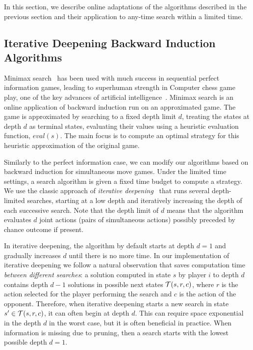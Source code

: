 
In this section, we describe online adaptations of the algorithms described in the previous section and their application
to any-time search within a limited time.

\subsection{Iterative Deepening Backward Induction Algorithms} \label{sec:idbi}

Minimax search~\cite{AIbook} has been used with much success in sequential perfect information games,
leading to superhuman strength in Computer chess game play, one of the key advances of artificial
intelligence~\cite{Campbell02deepblue}.
Minimax search is an online application of backward induction run on an approximated game.
The game is approximated by searching to a fixed depth limit $d$, treating the states at depth $d$
as terminal states, evaluating their values using a heuristic evaluation function, $eval(s)$.
The main focus is to compute an optimal strategy for this heuristic approximation of the original game.

Similarly to the perfect information case, we can modify our algorithms based on backward induction for simultaneous move games.
Under the limited time settings, a search algorithm is given a fixed time budget to compute a strategy.
We use the classic approach of {\it iterative deepening}~\cite{AIbook} that runs several depth-limited
searches, starting at a low depth and iteratively increasing the depth of each successive search.
Note that the depth limit of $d$ means that the algorithm evaluates $d$ joint actions (\ie pairs of simultaneous actions) possibly preceded by chance outcome if present.

In iterative deepening, the algorithm by default starts at depth $d = 1$ and gradually increases $d$ until there is no more time.
In our implementation of iterative deepening we follow a natural observation that saves computation time {\it between different searches}: 
a solution computed in state $s$ by player $i$ to depth $d$ contains depth $d-1$ solutions in possible next states $\mathcal{T}(s,r,c)$, where $r$ is the action selected for the player performing the search and $c$ is the action of the opponent.
Therefore, when iterative deepening starts a new search in state $s' \in \mathcal{T}(s,r,c)$, it can often begin at depth $d$.
This can require space exponential in the depth $d$ in the worst case, but it is often beneficial in practice. 
When information is missing due to pruning, then a search starts with the lowest possible depth $d = 1$.

